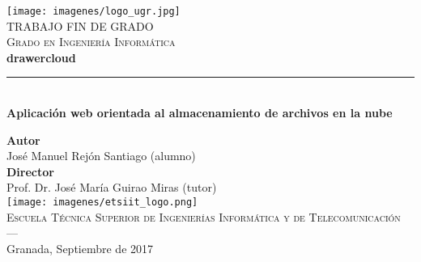 \begin{titlepage}
 
 
\newlength{\centeroffset}
\setlength{\centeroffset}{-0.5\oddsidemargin}
\addtolength{\centeroffset}{0.5\evensidemargin}
\thispagestyle{empty}

\noindent\hspace*{\centeroffset}\begin{minipage}{\textwidth}

\centering
\texttt{[image: imagenes/logo\_ugr.jpg]}\\[1.4cm]

\textsc{ \Large TRABAJO FIN DE GRADO\\[0.2cm]}
\textsc{ Grado en Ingeniería Informática}\\[1cm]
% 
{\Huge\bfseries drawercloud\\
}
\noindent\rule[-1ex]{\textwidth}{3pt}\\[3.5ex]
{\large\bfseries Aplicación web orientada al almacenamiento de archivos en la nube}
\end{minipage}

\vspace{2.5cm}
\noindent\hspace*{\centeroffset}\begin{minipage}{\textwidth}
\centering

\textbf{Autor}\\ {José Manuel Rejón Santiago (alumno)}\\[2.5ex]
\textbf{Director}\\
{Prof. Dr. José María Guirao Miras (tutor)}\\[2cm]
\texttt{[image: imagenes/etsiit\_logo.png]}\\[0.1cm]
\textsc{Escuela Técnica Superior de Ingenierías Informática y de Telecomunicación}\\
\textsc{---}\\
Granada, Septiembre de 2017
\end{minipage}
\end{titlepage}


